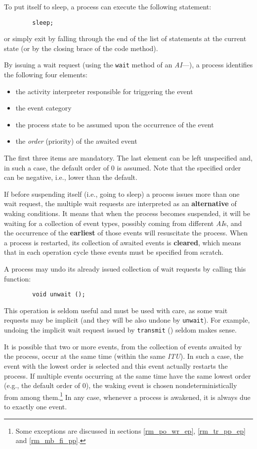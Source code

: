To put itself to sleep, a process can execute
the following statement:
\begin{verbatim}
        sleep;
\end{verbatim}
or simply exit by falling through the end of the list of statements at the
current state (or by the closing brace of the code method).

By issuing a wait request (using the {\tt wait} method of an
{\em AI\/}---), a process identifies the following
four elements:
\begin{itemize}
\item
the activity interpreter responsible for triggering the event
\item
the event category
\item
the process state to be assumed upon the occurrence of the event
\item
the {\em order\/} (priority) of the awaited event
\end{itemize}

The first three items are mandatory.
The last element can be left unspecified and, in such a case, the default order
of 0 is assumed.
Note that the specified order can be negative, i.e., lower than the
default.

If before suspending itself (i.e., going to sleep) a process issues more
than one wait request, the multiple wait requests are interpreted as an
{\bf alternative} of waking conditions.
It means that when the process becomes suspended, it will be waiting for
a collection of event types, possibly coming from different {\em AI\/}s,
and the occurrence of the 
{\bf earliest} of those events will resuscitate the process.
When a process is restarted, its collection of awaited events is {\bf cleared},
which means that in each operation cycle these events must be specified
from scratch.

A process may undo its already issued collection of wait requests by calling
this function:
\begin{verbatim}
        void unwait ();
\end{verbatim}
\noindent
This operation is seldom useful and must be used with care, as some wait
requests may be implicit (and they will be also undone by {\tt unwait}).
For example, undoing the implicit wait request issued by
{\tt transmit} () seldom makes sense.

It is possible that
two or more events, from the collection of events awaited by the process,
occur at the same time (within the same {\em ITU\/}).
In such a case, the event with the lowest order
is selected and this event actually restarts the process.
If multiple events occurring at the same time have the same
lowest order (e.g., the default order of 0),
the waking event is chosen nondeterministically from among them.\footnote{Some
exceptions are 
discussed in sections \ref{rm_po_wr_ep}, \ref{rm_tr_pp_ep} and \ref{rm_mb_fi_pp}.}
In any case,
whenever a process is awakened, it is always due to exactly one event.

